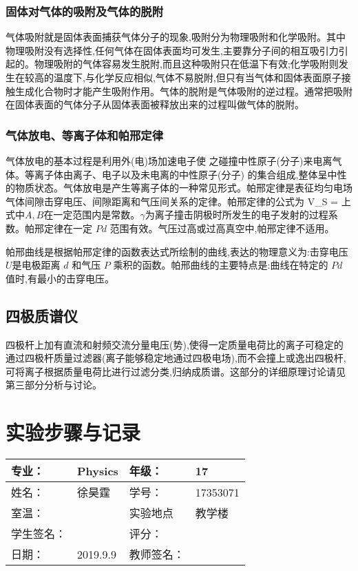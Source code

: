 \documentclass{ctexart}
\begin{document}
\subsubsection{固体对气体的吸附及气体的脱附}
气体吸附就是固体表面捕获气体分子的现象,吸附分为物理吸附和化学吸附。其中物理吸附没有选择性,任何气体在固体表面均可发生,主要靠分子间的相互吸引力引起的。物理吸附的气体容易发生脱附,而且这种吸附只在低温下有效;化学吸附则发生在较高的温度下,与化学反应相似,气体不易脱附,但只有当气体和固体表面原子接触生成化合物时才能产生吸附作用。气体的脱附是气体吸附的逆过程。通常把吸附在固体表面的气体分子从固体表面被释放出来的过程叫做气体的脱附。
\subsubsection{气体放电、等离子体和帕邢定律}
气体放电的基本过程是利用外(电)场加速电子使
之碰撞中性原子(分子)来电离气体。等离子体由离子、电子以及未电离的中性原子(分子)
的集合组成,整体呈中性的物质状态。气体放电是产生等离子体的一种常见形式。帕邢定律是表征均匀电场气体间隙击穿电压、间隙距离和气压间关系的定律。帕邢定律的公式为
\beq
V_S = 
\eeq
上式中$A,B$在一定范围内是常数。$\gamma$为离子撞击阴极时所发生的电子发射的过程系数。帕邢定律在一定 $Pd$ 范围有效。气压过高或过高真空中,帕邢定律不适用。

帕邢曲线是根据帕邢定律的函数表达式所绘制的曲线,表达的物理意义为:击穿电压$U$是电极距离 $d$ 和气压 $P$ 乘积的函数。帕邢曲线的主要特点是:曲线在特定的 $Pd$ 值时,有最小的击穿电压。
\subsection{四极质谱仪}
四极杆上加有直流和射频交流分量电压(势),使得一定质量电荷比的离子可稳定的通过四极杆质量过滤器(离子能够稳定地通过四极电场),而不会撞上或逸出四极杆,可将离子根据质量电荷比进行过滤分类,归纳成质谱。这部分的详细原理讨论请见第三部分分析与讨论。
\newpage
\section{实验步骤与记录}
\begin{tabular}{|p{8em}|p{8em}|p{8em}|p{8em}|}
	\hline 
	专业：     &Physics       &年级：      & 17     \\
	\hline
	姓名：& 徐昊霆 &学号：&17353071  \\
	\hline
	室温：&                    &实验地点 & 教学楼 \\
	\hline	
	学生签名： & & 评分： & \\
	\hline
	日期： & 2019.9.9 & 教师签名：&  \\
	\hline
\end{tabular}
\end{document}

